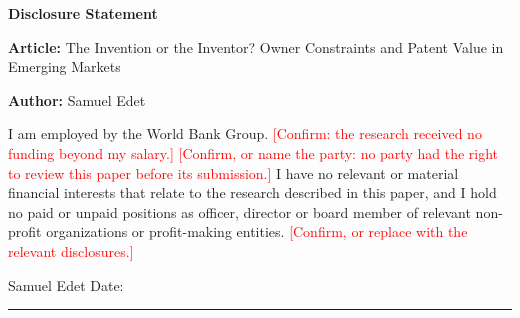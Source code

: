 \documentclass[11pt]{article}
\newcommand{\confirm}[1]{\textcolor{red}{[#1]}}
\begin{document}
\thispagestyle{empty}

\begin{center}
{\large\textbf{Disclosure Statement}}
\end{center}

\bigskip
\noindent\textbf{Article:} The Invention or the Inventor? Owner Constraints and Patent Value in Emerging Markets

\noindent\textbf{Author:} Samuel Edet

\bigskip
\noindent I am employed by the World Bank Group. \confirm{Confirm: the research received no funding beyond my salary.}
\confirm{Confirm, or name the party: no party had the right to review this paper before its submission.}
I have no relevant or material financial interests that relate to the research described in this paper, and I hold
no paid or unpaid positions as officer, director or board member of relevant non-profit organizations or
profit-making entities. \confirm{Confirm, or replace with the relevant disclosures.}

\vspace{2cm}
\noindent Samuel Edet \hfill Date: \rule{4cm}{0.4pt}
\end{document}

